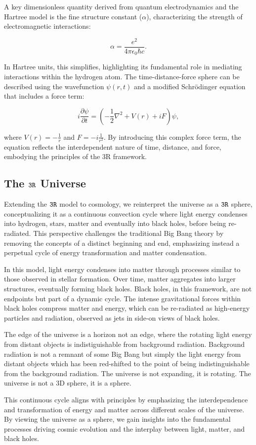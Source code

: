 \documentclass[12pt]{article}
\begin{document}
A key dimensionless quantity derived from quantum electrodynamics and the Hartree model is the fine structure constant (\(\alpha\)), characterizing the strength of electromagnetic interactions:

\[
    \alpha = \frac{e^2}{4\pi \epsilon_0 \hbar c}.
\]

In Hartree units, this simplifies, highlighting its fundamental role in mediating interactions within the hydrogen atom. The time-distance-force sphere can be described using the wavefunction \(\psi(r, t)\) and a modified Schrödinger equation that includes a force term:

\[
    i \frac{\partial \psi}{\partial t} = \left( -\frac{1}{2} \nabla^2 + V(r) + iF \right) \psi,
\]

where \(V(r) = -\frac{1}{r}\) and \(F = -i \frac{1}{r^2}\). By introducing this complex force term, the equation reflects the interdependent nature of time, distance, and force, embodying the principles of the 3R framework.

\subsection*{The \(\texttt{3R}\) Universe}

Extending the \(\texttt{3R}\) model to cosmology, we reinterpret the universe as a \(\texttt{3R}\) sphere, conceptualizing it as a continuous convection cycle where light energy condenses into hydrogen, stars, matter and eventually into black holes, before being re-radiated. This perspective challenges the traditional Big Bang theory by removing the concepts of a distinct beginning and end, emphasizing instead a perpetual cycle of energy transformation and matter condensation.

In this model, light energy condenses into matter through processes similar to those observed in stellar formation. Over time, matter aggregates into larger structures, eventually forming black holes. Black holes, in this framework, are not endpoints but part of a dynamic cycle. The intense gravitational forces within black holes compress matter and energy, which can be re-radiated as high-energy particles and radiation, observed as jets in side-on views of black holes.

The edge of the universe is a horizon not an edge, where the rotating light energy from distant objects is indistiguishable from background radiation. Background radiation is not a remnant of some Big Bang but simply the light energy from distant objects which has been red-shifted to the point of being indistinguishable from the background radiation. The universe is not expanding, it is rotating. The universe is not a 3D sphere, it is a \iR{} sphere.

This continuous cycle aligns with \iR{} principles by emphasizing the interdependence and transformation of energy and matter across different scales of the universe. By viewing the universe as a \iR{} sphere, we gain insights into the fundamental processes driving cosmic evolution and the interplay between light, matter, and black holes.
\end{document}
